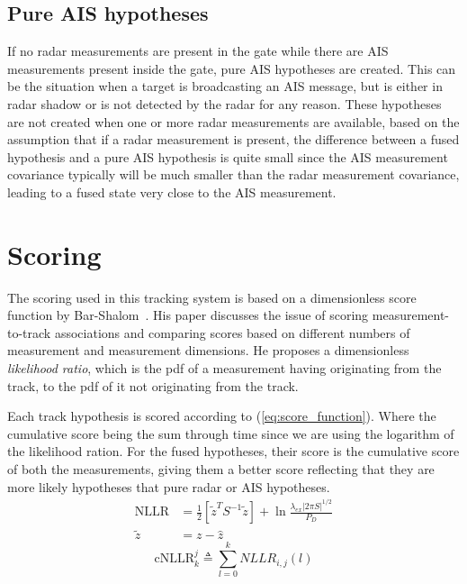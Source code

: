 \subsection{Pure AIS hypotheses}\label{subsec:pure_ais_hypotheses}
If no radar measurements are present in the gate while there are AIS measurements present inside the gate, pure AIS hypotheses are created. This can be the situation when a target is broadcasting an AIS message, but is either in radar shadow or is not detected by the radar for any reason. These hypotheses are not created when one or more radar measurements are available, based on the assumption that if a radar measurement is present, the difference between a fused hypothesis and a pure AIS hypothesis is quite small since the AIS measurement covariance typically will be much smaller than the radar measurement covariance, leading to a fused state very close to the AIS measurement.

\section{Scoring}
The scoring used in this tracking system is based on a dimensionless score function by Bar-Shalom~\cite{Bar-Shalom2007}. His paper discusses the issue of scoring measurement-to-track associations and comparing scores based on different numbers of measurement and measurement dimensions. He proposes a dimensionless \emph{likelihood ratio}, which is the \gls{pdf} of a measurement having originating from the track, to the \gls{pdf} of it not originating from the track.~

Each \gls{track hypothesis} is scored according to (\ref{eq:score_function}). Where the cumulative score being the sum through time since we are using the logarithm of the likelihood ration. For the fused hypotheses, their score is the cumulative score of both the measurements, giving them a better score reflecting that they are more likely hypotheses that pure radar or AIS hypotheses. 
\begin{equation}\label{eq:score_function}
\begin{split}
\mathrm{NLLR} &= \frac{1}{2} \left[ {\tilde{z}}^{T} {S}^{-1} \tilde{z} \right] + \ln \frac{\lambda_{ex} |2 \pi S|^{1/2}} {P_D} \\				
\tilde{z} &= z -\hat{z}
\end{split}
\end{equation}
\begin{equation}
\mathrm{cNLLR}_k^j \triangleq \sum_{l=0}^k NLLR_{i,j}(l)
\end{equation}

